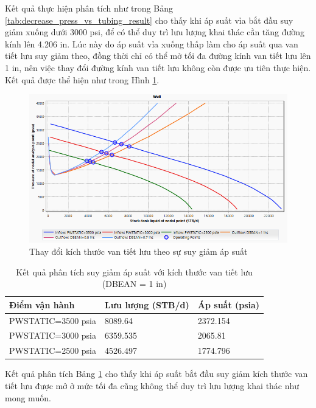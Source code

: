 \documentclass[12pt,a4paper]{report}
\begin{document}
Kết quả thực hiện phân tích như trong Bảng \ref{tab:decrease_press_vs_tubing_result} cho thấy khi áp suất vỉa bắt đầu suy giảm xuống dưới 3000 psi, để có thể duy trì lưu lượng khai thác cần tăng đường kính lên 4.206 in. Lúc này do áp suất vỉa xuống thấp làm cho áp suất qua van tiết lưu suy giảm theo, đồng thời chỉ có thể mở tối đa đường kính van tiết lưu lên 1 in, nên việc thay đổi đường kính van tiết lưu không còn được ưu tiên thực hiện. Kết quả được thể hiện như trong Hình \ref{fig:decrease_press_vs_choke_size}.
\newpage
	\begin{figure}[h]
		\centering
		\includegraphics[scale=0.75]{Fig/decrease_press_vs_choke_size.PNG}
		\caption{Thay đổi kích thước van tiết lưu theo sự suy giảm áp suất}
		\label{fig:decrease_press_vs_choke_size}
	\end{figure}

\begin{table}[h]
\caption{Kết quả phân tích suy giảm áp suất với kích thước van tiết lưu (DBEAN = 1 in)}\label{tab:decrease_press_vs_choke_size_result}
\begin{tabularx}{\textwidth}{@{}XXX@{}}
\toprule
Điểm vận hành                  & Lưu lượng (STB/d) & Áp suất (psia) \\ \midrule
PWSTATIC=3500 psia & 8089.64           & 2372.154       \\
PWSTATIC=3000 psia & 6359.535          & 2065.81        \\
PWSTATIC=2500 psia & 4526.497          & 1774.796       \\ \bottomrule
\end{tabularx}
\end{table}
Kết quả phân tích Bảng \ref{tab:decrease_press_vs_choke_size_result} cho thấy khi áp suất bắt đầu suy giảm kích thước van tiết lưu được mở ở mức tối đa cũng không thể duy trì lưu lượng khai thác như mong muốn.
\end{document}
